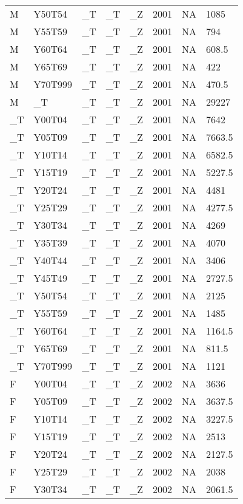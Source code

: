 \begin{longtable}[t]{llllllll}
M & Y50T54 & \_T & \_T & \_Z & 2001 & NA & 1085\\
M & Y55T59 & \_T & \_T & \_Z & 2001 & NA & 794\\
M & Y60T64 & \_T & \_T & \_Z & 2001 & NA & 608.5\\
M & Y65T69 & \_T & \_T & \_Z & 2001 & NA & 422\\
\addlinespace
M & Y70T999 & \_T & \_T & \_Z & 2001 & NA & 470.5\\
M & \_T & \_T & \_T & \_Z & 2001 & NA & 29227\\
\_T & Y00T04 & \_T & \_T & \_Z & 2001 & NA & 7642\\
\_T & Y05T09 & \_T & \_T & \_Z & 2001 & NA & 7663.5\\
\_T & Y10T14 & \_T & \_T & \_Z & 2001 & NA & 6582.5\\
\addlinespace
\_T & Y15T19 & \_T & \_T & \_Z & 2001 & NA & 5227.5\\
\_T & Y20T24 & \_T & \_T & \_Z & 2001 & NA & 4481\\
\_T & Y25T29 & \_T & \_T & \_Z & 2001 & NA & 4277.5\\
\_T & Y30T34 & \_T & \_T & \_Z & 2001 & NA & 4269\\
\_T & Y35T39 & \_T & \_T & \_Z & 2001 & NA & 4070\\
\addlinespace
\_T & Y40T44 & \_T & \_T & \_Z & 2001 & NA & 3406\\
\_T & Y45T49 & \_T & \_T & \_Z & 2001 & NA & 2727.5\\
\_T & Y50T54 & \_T & \_T & \_Z & 2001 & NA & 2125\\
\_T & Y55T59 & \_T & \_T & \_Z & 2001 & NA & 1485\\
\_T & Y60T64 & \_T & \_T & \_Z & 2001 & NA & 1164.5\\
\addlinespace
\_T & Y65T69 & \_T & \_T & \_Z & 2001 & NA & 811.5\\
\_T & Y70T999 & \_T & \_T & \_Z & 2001 & NA & 1121\\
F & Y00T04 & \_T & \_T & \_Z & 2002 & NA & 3636\\
F & Y05T09 & \_T & \_T & \_Z & 2002 & NA & 3637.5\\
F & Y10T14 & \_T & \_T & \_Z & 2002 & NA & 3227.5\\
\addlinespace
F & Y15T19 & \_T & \_T & \_Z & 2002 & NA & 2513\\
F & Y20T24 & \_T & \_T & \_Z & 2002 & NA & 2127.5\\
F & Y25T29 & \_T & \_T & \_Z & 2002 & NA & 2038\\
F & Y30T34 & \_T & \_T & \_Z & 2002 & NA & 2061.5\\

\end{longtable}
